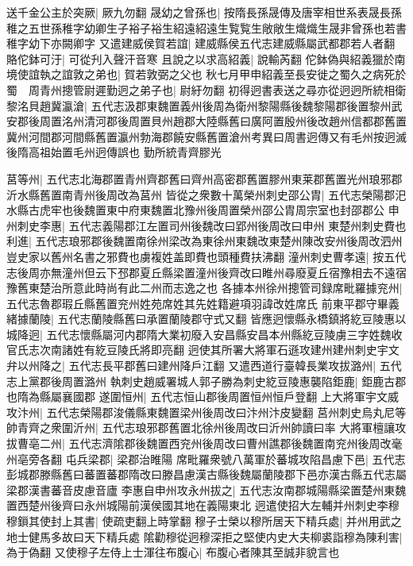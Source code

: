 送千金公主於突厥|{
	厥九勿翻}
晟幼之曾孫也|{
	按隋長孫晟傳及唐宰相世系表晟長孫稚之五世孫稚字幼卿生子裕子裕生紹遠紹遠生覧覧生敞敞生熾熾生晟非曾孫也若書稚字幼下亦闕卿字}
又遣建威侯賀若誼|{
	建威縣侯五代志建威縣屬武都郡若人者翻}
賂佗鉢可汙|{
	可從刋入聲汗音寒}
且說之以求高紹義|{
	說輸芮翻}
佗鉢偽與紹義獵於南境使誼執之誼敦之弟也|{
	賀若敦弼之父也}
秋七月甲申紹義至長安徙之蜀久之病死於蜀　周青州摠管尉遲勤迥之弟子也|{
	尉紆勿翻}
初得迥書表送之尋亦從迥迥所統相衛黎洺貝趙冀瀛滄|{
	五代志汲郡東魏置義州後周為衛州黎陽縣後魏黎陽郡後置黎州武安郡後周置洺州清河郡後周置貝州趙郡大陸縣舊曰廣阿置殷州後改趙州信都郡舊置冀州河間郡河間縣舊置瀛州勃海郡饒安縣舊置滄州考異曰周書迥傳又有毛州按迥滅後隋高祖始置毛州迥傳誤也}
勤所統青齊膠光

莒等州|{
	五代志北海郡置青州齊郡舊曰齊州高密郡舊置膠州東莱郡舊置光州琅邪郡沂水縣舊置南青州後周改為莒州}
皆從之衆數十萬榮州刺史邵公胄|{
	五代志榮陽郡汜水縣古虎牢也後魏置東中府東魏置北豫州後周置榮州邵公胄周宗室也封邵郡公}
申州刺史李惠|{
	五代志義陽郡江左置司州後魏改曰郢州後周改曰申州}
東楚州刺史費也利進|{
	五代志琅邪郡後魏置南徐州梁改為東徐州東魏改東楚州陳改安州後周改泗州豈史家以舊州名書之邪費也虜複姓盖即費也頭種費扶沸翻}
潼州刺史曹孝遠|{
	按五代志後周亦無潼州但云下邳郡夏丘縣梁置潼州後齊改曰睢州尋廢夏丘宿豫相去不遠宿豫舊東楚治所意此時尚有此二州而志逸之也}
各據本州徐州摠管司録席毗羅據兖州|{
	五代志魯郡瑕丘縣舊置兖州姓苑席姓其先姓籍避項羽諱改姓席氏}
前東平郡守畢義緒據蘭陵|{
	五代志蘭陵縣舊曰承置蘭陵郡守式又翻}
皆應迥懷縣永橋鎮將紇豆陵惠以城降迥|{
	五代志懷縣屬河内郡隋大業初廢入安昌縣安昌本州縣紇豆陵虜三字姓魏收官氏志次南諸姓有紇豆陵氏將即亮翻}
迥使其所署大將軍石遜攻建州建州刺史宇文弁以州降之|{
	五代志長平郡舊曰建州降戶江翻}
又遣西道行臺韓長業攻拔潞州|{
	五代志上黨郡後周置潞州}
執刺史趙威署城人郭子勝為刺史紇豆陵惠襲陷鉅鹿|{
	鉅鹿古郡也隋為縣屬襄國郡}
遂圍恒州|{
	五代志恒山郡後周置恒州恒戶登翻}
上大將軍宇文威攻汴州|{
	五代志榮陽郡浚儀縣東魏置梁州後周改曰汴州汴皮變翻}
莒州刺史烏丸尼等帥青齊之衆圍沂州|{
	五代志琅邪郡舊置北徐州後周改曰沂州帥讀曰率}
大將軍檀讓攻拔曹亳二州|{
	五代志濟隂郡後魏置西兖州後周改曰曹州譙郡後魏置南兖州後周改毫州亳旁各翻}
屯兵梁郡|{
	梁郡治睢陽}
席毗羅衆號八萬軍於蕃城攻陷昌慮下邑|{
	五代志彭城郡滕縣舊曰蕃置蕃郡隋改曰滕昌慮漢古縣後魏屬蘭陵郡下邑亦漢古縣五代志屬梁郡漢書蕃音皮慮音廬}
李惠自申州攻永州拔之|{
	五代志汝南郡城陽縣梁置楚州東魏置西楚州後齊曰永州城陽前漢侯國其地在義陽東北}
迥遣使招大左輔并州刺史李穆穆鎻其使封上其書|{
	使疏吏翻上時掌翻}
穆子士榮以穆所居天下精兵處|{
	并州用武之地士健馬多故曰天下精兵處}
隂勸穆從迥穆深拒之堅使内史大夫柳裘詣穆為陳利害|{
	為于偽翻}
又使穆子左侍上士渾往布腹心|{
	布腹心者陳其至誠非貌言也}
